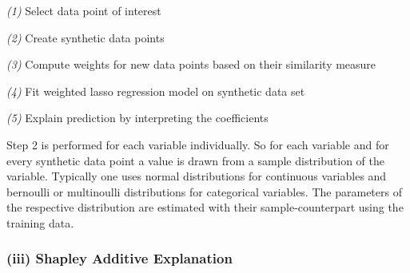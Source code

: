 \documentclass[12pt,titlepage]{article}
\begin{document}
\vspace{3mm}
\textit{(1)} Select data point of interest \par
\textit{(2)} Create synthetic data points \par
\textit{(3)} Compute weights for new data points based on their similarity measure \par
\textit{(4)} Fit weighted lasso regression model on synthetic data set \par
\textit{(5)} Explain prediction by interpreting the coefficients \\
\vspace{1mm}

\noindent
Step 2 is performed for each variable individually. So for each variable and for every synthetic data point a value is drawn from a sample distribution of the variable. Typically one uses normal distributions for continuous variables and bernoulli or multinoulli distributions for categorical variables. The parameters of the respective distribution are estimated with their sample-counterpart using the training data. \\

\subsubsection*{(iii) Shapley Additive Explanation}
\end{document}
